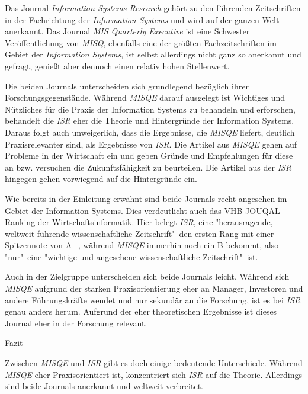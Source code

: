 \documentclass[12pt,utf8]{scrartcl}
\begin{document}
\begin{flushleft}
Das Journal \emph{Information Systems Research} gehört zu den führenden Zeitschriften in der Fachrichtung der \emph{Information Systems} und wird auf der ganzen Welt anerkannt. Das Journal \emph{MIS Quarterly Executive} ist eine Schwester Veröffentlichung von \emph{MISQ}\citep{MISQE}, ebenfalls eine der größten Fachzeitschriften im Gebiet der \emph{Information Systems}, ist selbst allerdings nicht ganz so anerkannt und gefragt, genießt aber dennoch einen relativ hohen Stellenwert.

Die beiden Journals unterscheiden sich grundlegend bezüglich ihrer Forschungsgegenstände. Während \emph{MISQE} darauf ausgelegt ist Wichtiges und Nützliches für die Praxis der Information Systems zu behandeln und erforschen\citep{MISQE}, behandelt die \emph{ISR} eher die Theorie und Hintergründe der Information Systems\citep{ISR}. Daraus folgt auch unweigerlich, dass die Ergebnisse, die \emph{MISQE} liefert, deutlich Praxisrelevanter sind, als Ergebnisse von \emph{ISR}. Die Artikel aus \emph{MISQE} gehen auf Probleme in der Wirtschaft ein und geben Gründe und Empfehlungen für diese an bzw. versuchen die Zukunftsfähigkeit zu beurteilen\citep{Chasin2017}\cite{Lacity2017}. Die Artikel aus der \emph{ISR} hingegen gehen vorwiegend auf die Hintergründe ein\cite{Karhu2018}\cite{Constantinides2018}.

Wie bereits in der Einleitung erwähnt sind beide Journals recht angesehen im Gebiet der Information Systems. Dies verdeutlicht auch das VHB-JOUQAL-Ranking der Wirtschaftsinformatik. Hier belegt \emph{ISR}, eine "herausragende, weltweit führende wissenschaftliche Zeitschrift"\ den ersten Rang mit einer Spitzennote von A+, während \emph{MISQE} immerhin noch ein B bekommt, also "nur"\ eine "wichtige und angesehene wissenschaftliche Zeitschrift"\ ist\cite{VHBJ}.

Auch in der Zielgruppe unterscheiden sich beide Journals leicht. Während sich \emph{MISQE} aufgrund der starken Praxisorientierung eher an Manager, Investoren und andere Führungskräfte\citep{Chasin2017}\citep{MISQE} wendet und nur sekundär an die Forschung, ist es bei \emph{ISR} genau anders herum. Aufgrund der eher theoretischen Ergebnisse ist dieses Journal eher in der Forschung relevant\citep{ISR}. 
\newline

{\Large Fazit}

Zwischen \emph{MISQE} und \emph{ISR} gibt es doch einige bedeutende Unterschiede. Während \emph{MISQE} eher Praxisorientiert ist, konzentriert sich \emph{ISR} auf die Theorie. Allerdings sind beide Journals anerkannt und weltweit verbreitet. 




\end{flushleft}
\end{document}
